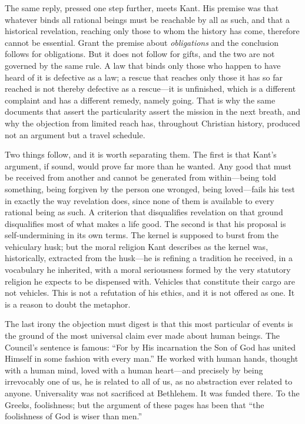 The same reply, pressed one step further, meets Kant. His premise was that whatever binds all rational beings must be reachable by all as such, and that a historical revelation, reaching only those to whom the history has come, therefore cannot be essential. Grant the premise about \emph{obligations} and the conclusion follows for obligations. But it does not follow for gifts, and the two are not governed by the same rule. A law that binds only those who happen to have heard of it is defective as a law; a rescue that reaches only those it has so far reached is not thereby defective as a rescue---it is unfinished, which is a different complaint and has a different remedy, namely going. That is why the same documents that assert the particularity assert the mission in the next breath, and why the objection from limited reach has, throughout Christian history, produced not an argument but a travel schedule.

Two things follow, and it is worth separating them. The first is that Kant's argument, if sound, would prove far more than he wanted. Any good that must be received from another and cannot be generated from within---being told something, being forgiven by the person one wronged, being loved---fails his test in exactly the way revelation does, since none of them is available to every rational being as such. A criterion that disqualifies revelation on that ground disqualifies most of what makes a life good. The second is that his proposal is self-undermining in its own terms. The kernel is supposed to burst from the vehiculary husk; but the moral religion Kant describes as the kernel was, historically, extracted from the husk---he is refining a tradition he received, in a vocabulary he inherited, with a moral seriousness formed by the very statutory religion he expects to be dispensed with. Vehicles that constitute their cargo are not vehicles. This is not a refutation of his ethics, and it is not offered as one. It is a reason to doubt the metaphor.

The last irony the objection must digest is that this most particular of events is the ground of the most universal claim ever made about human beings. The Council's sentence is famous: ``For by His incarnation the Son of God has united Himself in some fashion with every man.'' He worked with human hands, thought with a human mind, loved with a human heart---and precisely by being irrevocably one of us, he is related to all of us, as no abstraction ever related to anyone. Universality was not sacrificed at Bethlehem. It was funded there. To the Greeks, foolishness; but the argument of these pages has been that ``the foolishness of God is wiser than men.''
